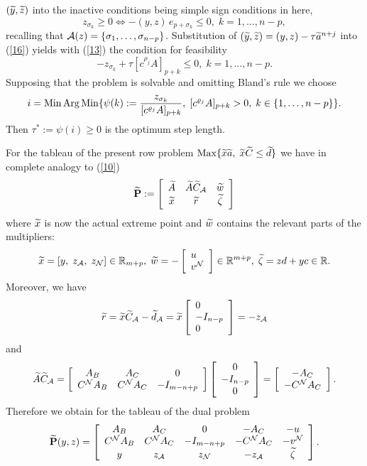 $(\wi{y}, \wi{z})$ into the inactive conditions being simple sign conditions in
here,
%
\begin{equation} \label{16}
z_{\sigma _k} \geq 0 \Longleftrightarrow - (y, z)
\, e_{p + \sigma _k} \leq 0, \; k = 1, \ldots, n - p,
\end{equation}
recalling that $\A(z) = \{\sigma _1, \ldots, \sigma _{n-p}\}$.
Substitution of
 $(\wi{y}, \wi{z}) = (y,z) - \tau \wi{a}^{n+j}$ into
(\ref{16}) yields with	(\ref{13}) the condition for feasibility
\[
- z_{\sigma _k} + \tau [c^{\rho _j}A]_{p+k} \leq 0, \; k = 1, \ldots ,n - p.
\]
Supposing that the problem is solvable and omitting {\sc Bland}'s rule we
choose
%
\begin{equation} \label{17}
\dis i = \Min \Arg \Min \{\psi(k) := \frac{z_{\sigma
_k}}
{[c^{\rho _j}A]_{p+k}}, \;
%
[c^{\rho _j}A]_{p+k} > 0, \;  k \in \{1, \ldots, n - p\}\}.
\end{equation}
%
Then $\tau ^* := \psi(i) \geq 0$ is the optimum step length.
\par
For the tableau of the present row problem $\Max\{\wi{x}\wi{a}, \;
\wi{x}\wi{C} \leq \wi{d}\}$ we have in complete analogy to (\ref{10})
%
\begin{equation} \label{18}
\wi{{\bf P}} :=
\ba{[}{ccc} \wi{A} & \wi{A}\wi{C}_{\A} & \wi{w}\\
\wi{x} & \wi{r} & \wi{\zeta} \ea{]}
\end{equation}
%
where $\wi{x}$ is now the actual extreme point and $\wi{w}$ contains the
relevant parts of the multipliers:
\[
\wi{x} = [y, \; z_{\A}, \; z_{\N}] \in \Bbb{R}_{m+p}, \;
\wi{w} = - \ba{[}{l}u \\v^{\N}\ea{]} \in \Bbb{R}^{m+p}, \;
\wi{\zeta} = zd + yc \in \Bbb{R}.
\]
Moreover, we have
\[
\wi{r} = \wi{x}\wi{C}_{\A} - \wi{d}_{\A} = \wi{x}\ba{[}{l}0\\-I_{n-p}\\ 0\ea{]}
= -z_{\A}
\]
and
%
\[
\wi{A}\wi{C}_{\A} =
\ba{[}{ccc} A_B & A_C & 0\\ C^{\N}A_B & C^{\N}A_C & - I_{m-n+p}
\ea{]}\ba{[}{c} 0 \\ - I_{n-p} \\ 0 \ea{]}
= \ba{[}{c}- A_C \\ - C^{\N}A_C \ea{]}.
\]
Therefore we obtain for the tableau of the dual problem
%
\[
\wi{{\bf P}}(y,z)
=
\ba{[}{ccccc}
A_B	  & A_C       & 0	    & -A_C	      &  - u \\
C^{\N}A_B & C^{\N}A_C & - I_{m-n+p} & -C^{\N}A_C      &  - v^{\N}\\
y	  & z_{\A}    & z_{\N}	    & -z_{\A}	      & \wi{\zeta}
\ea{]}.
\]
